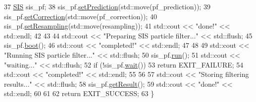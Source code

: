 \begin{DoxyCodeInclude}
37     \mbox{\hyperlink{classbfl_1_1SIS}{SIS}} sis\_pf;
38     sis\_pf.\mbox{\hyperlink{classbfl_1_1ParticleFilter_a213811368143c1f498c87be70cf02379}{setPrediction}}(std::move(pf\_prediction));
39     sis\_pf.\mbox{\hyperlink{classbfl_1_1ParticleFilter_a3d2935addf4481325a3fe8b99fe4d07a}{setCorrection}}(std::move(pf\_correction));
40     sis\_pf.\mbox{\hyperlink{classbfl_1_1ParticleFilter_ad1618ed06b6e6e143e309e2267b970ee}{setResampling}}(std::move(resampling));
41     std::cout << \textcolor{stringliteral}{"done!"} << std::endl;
42 
43 
44     std::cout << \textcolor{stringliteral}{"Preparing SIS particle filter..."} << std::flush;
45     sis\_pf.\mbox{\hyperlink{classbfl_1_1FilteringAlgorithm_a96651f8464190c0a56d79219a1017147}{boot}}();
46     std::cout << \textcolor{stringliteral}{"completed!"} << std::endl;
47 
48 
49     std::cout << \textcolor{stringliteral}{"Running SIS particle filter..."} << std::flush;
50     sis\_pf.\mbox{\hyperlink{classbfl_1_1FilteringAlgorithm_a009cbe5f4bbb16967f6c6ddcaed8fbb1}{run}}();
51     std::cout << \textcolor{stringliteral}{"waiting..."} << std::flush;
52     \textcolor{keywordflow}{if} (!sis\_pf.\mbox{\hyperlink{classbfl_1_1FilteringAlgorithm_a40372c24fa050eb0274371172df0a244}{wait}}())
53         \textcolor{keywordflow}{return} EXIT\_FAILURE;
54     std::cout << \textcolor{stringliteral}{"completed!"} << std::endl;
55 
56 
57     std::cout << \textcolor{stringliteral}{"Storing filtering results..."} << std::flush;
58     sis\_pf.\mbox{\hyperlink{classbfl_1_1SIS_a059da4c932379643ff7005fe4d0fda89}{getResult}}();
59     std::cout << \textcolor{stringliteral}{"done!"} << std::endl;
60 
61 
62     \textcolor{keywordflow}{return} EXIT\_SUCCESS;
63 \}
\end{DoxyCodeInclude}
 